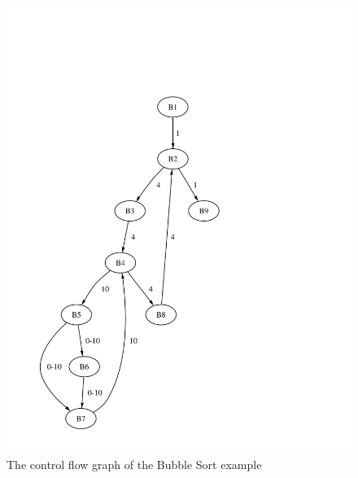 
\begin{figure}
    \centering
    \includegraphics[height=\excelwidth]{results/results_wcet_cfg}
    \caption{The control flow graph of the Bubble Sort example}
    \label{fig:results:wcet:cfg}
\end{figure}



%    


